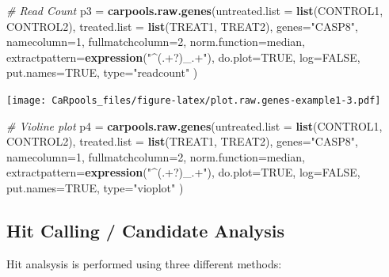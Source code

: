 \documentclass[]{article}
\newenvironment{Shaded}{\begin{snugshade}}{\end{snugshade}}
\newcommand{\KeywordTok}[1]{\textcolor[rgb]{0.13,0.29,0.53}{\textbf{{#1}}}}
\newcommand{\DataTypeTok}[1]{\textcolor[rgb]{0.13,0.29,0.53}{{#1}}}
\newcommand{\DecValTok}[1]{\textcolor[rgb]{0.00,0.00,0.81}{{#1}}}
\newcommand{\StringTok}[1]{\textcolor[rgb]{0.31,0.60,0.02}{{#1}}}
\newcommand{\CommentTok}[1]{\textcolor[rgb]{0.56,0.35,0.01}{\textit{{#1}}}}
\newcommand{\OtherTok}[1]{\textcolor[rgb]{0.56,0.35,0.01}{{#1}}}
\newcommand{\NormalTok}[1]{{#1}}
\begin{document}
\begin{Shaded}
\begin{Highlighting}[]
\CommentTok{# Read Count}
\NormalTok{p3 =}\StringTok{ }\KeywordTok{carpools.raw.genes}\NormalTok{(}\DataTypeTok{untreated.list =} \KeywordTok{list}\NormalTok{(CONTROL1, CONTROL2),}
  \DataTypeTok{treated.list =} \KeywordTok{list}\NormalTok{(TREAT1, TREAT2), }\DataTypeTok{genes=}\StringTok{"CASP8"}\NormalTok{, }\DataTypeTok{namecolumn=}\DecValTok{1}\NormalTok{,}
  \DataTypeTok{fullmatchcolumn=}\DecValTok{2}\NormalTok{, }\DataTypeTok{norm.function=}\NormalTok{median, }\DataTypeTok{extractpattern=}\KeywordTok{expression}\NormalTok{(}\StringTok{"^(.+?)_.+"}\NormalTok{), }
  \DataTypeTok{do.plot=}\OtherTok{TRUE}\NormalTok{, }\DataTypeTok{log=}\OtherTok{FALSE}\NormalTok{, }\DataTypeTok{put.names=}\OtherTok{TRUE}\NormalTok{, }\DataTypeTok{type=}\StringTok{"readcount"} \NormalTok{)}
\end{Highlighting}
\end{Shaded}

\texttt{[image: CaRpools\_files/figure-latex/plot.raw.genes-example1-3.pdf]}

\begin{Shaded}
\begin{Highlighting}[]
\CommentTok{# Violine plot}
\NormalTok{p4 =}\StringTok{ }\KeywordTok{carpools.raw.genes}\NormalTok{(}\DataTypeTok{untreated.list =} \KeywordTok{list}\NormalTok{(CONTROL1, CONTROL2),}
  \DataTypeTok{treated.list =} \KeywordTok{list}\NormalTok{(TREAT1, TREAT2), }\DataTypeTok{genes=}\StringTok{"CASP8"}\NormalTok{, }\DataTypeTok{namecolumn=}\DecValTok{1}\NormalTok{,}
  \DataTypeTok{fullmatchcolumn=}\DecValTok{2}\NormalTok{, }\DataTypeTok{norm.function=}\NormalTok{median, }\DataTypeTok{extractpattern=}\KeywordTok{expression}\NormalTok{(}\StringTok{"^(.+?)_.+"}\NormalTok{), }
  \DataTypeTok{do.plot=}\OtherTok{TRUE}\NormalTok{, }\DataTypeTok{log=}\OtherTok{FALSE}\NormalTok{, }\DataTypeTok{put.names=}\OtherTok{TRUE}\NormalTok{, }\DataTypeTok{type=}\StringTok{"vioplot"} \NormalTok{)}
\end{Highlighting}
\end{Shaded}

\newpage

\subsection{Hit Calling / Candidate
Analysis}\label{hit-calling-candidate-analysis}

Hit analsysis is performed using three different methods:
\end{document}
